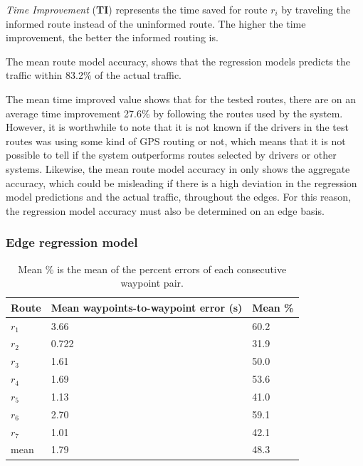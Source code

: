 \emph{Time Improvement} (\textbf{TI}) represents the time saved for route $r_i$ by traveling the informed route instead of the uninformed route. The higher the time improvement, the better the informed routing is.

The mean route model accuracy, shows that the regression models predicts the traffic within 83.2\% of the actual traffic. 

The mean time improved value shows that for the tested routes, there are on an average time improvement 27.6\% by following the routes used by the system. However, it is worthwhile to note that it is not known if the drivers in the test routes was using some kind of GPS routing or not, which means that it is not possible to tell if the system outperforms routes selected by drivers or other systems. Likewise, the mean route model accuracy in  only shows the aggregate accuracy, which could be misleading if there is a high deviation in the regression model predictions and the actual traffic, throughout the edges. For this reason, the regression model accuracy must also be determined on an edge basis.

\subsubsection{Edge regression model}

\begin{table}[H]
	\centering
	\begin{tabular}{lll}
		\textbf{Route} & \textbf{Mean waypoints-to-waypoint error (s)}    & \textbf{Mean \%} \\ \hline
		$r_1$          & 3.66                                             & 60.2 \\
		$r_2$          & 0.722                                            & 31.9 \\
		$r_3$          & 1.61                                             & 50.0 \\
		$r_4$          & 1.69                                             & 53.6 \\
		$r_5$          & 1.13                                             & 41.0 \\
		$r_6$          & 2.70                                             & 59.1 \\
		$r_7$          & 1.01                                             & 42.1 \\ \hline
		mean           & 1.79                                             & 48.3
	\end{tabular}
	\caption{Mean \% is the mean of the percent errors of each consecutive waypoint pair.}
	\label{tab:eval-results-2}
\end{table}
